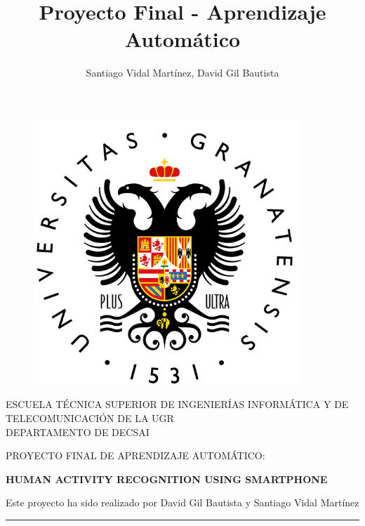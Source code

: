 \documentclass[a4paper,openright,12pt]{article}
\title{Proyecto Final - Aprendizaje Automático}
\author{Santiago Vidal Martínez, David Gil Bautista}
\begin{document}
\begin{titlepage}

\begin{center}
\vspace*{-1in}
\begin{figure}[htb]
\begin{center}
\includegraphics[width=10cm]{logo.png}
\end{center}
\end{figure}

ESCUELA TÉCNICA SUPERIOR DE INGENIERÍAS INFORMÁTICA Y DE TELECOMUNICACIÓN DE LA UGR\\
\vspace*{0.15in}
DEPARTAMENTO DE DECSAI \\
\vspace*{0.6in}

\begin{large}
PROYECTO FINAL DE APRENDIZAJE AUTOMÁTICO:\\
\end{large}
\vspace*{0.2in}
\begin{Large}
\textbf{HUMAN ACTIVITY RECOGNITION USING SMARTPHONE} \\
\end{Large}
\vspace*{0.3in}
\begin{large}
Este proyecto ha sido realizado por David Gil Bautista y Santiago Vidal Martínez\\
\end{large}
\vspace*{0.3in}
\rule{80mm}{0.1mm}\\
\vspace*{0.1in}
\end{center}

\end{titlepage}
\tableofcontents
\clearpage
\end{document}
